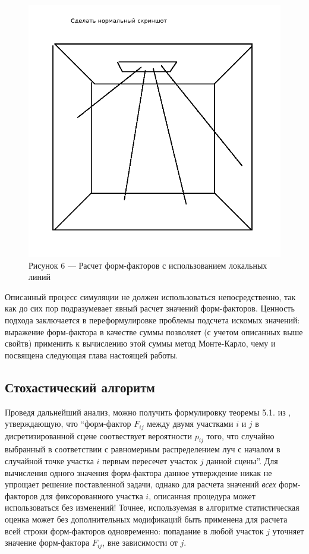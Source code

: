 \documentclass[12pt]{article}
\begin{document}
\begin{figure}[h]
\centering
\includegraphics[scale=0.3]{local_lines.png}
\caption*{Рисунок 6 --- Расчет форм-факторов с использованием локальных линий}
\end{figure}

Описанный процесс симуляции не должен использоваться непосредственно, так как до сих пор подразумевает явный расчет значений форм-факторов. Ценность подхода заключается в переформулировке проблемы подсчета искомых значений: выражение форм-фактора в качестве суммы позволяет (с учетом описанных выше свойтв) применить к вычислению этой суммы метод Монте-Карло, чему и посвящена следующая глава настоящей работы.

\subsection{Стохастический алгоритм}
Проведя дальнейший анализ, можно получить формулировку теоремы 5.1. из \cite{Bek99}, утверждающую, что ``форм-фактор $F_{ij}$ между двумя участками $i$ и $j$ в дисретизированной сцене соотвествует вероятности $p_{ij}$ того, что случайно выбранный в соответствии с равномерным распределением луч с началом в случайной точке участка $i$ первым пересечет участок $j$ данной сцены''. Для вычисления одного значения форм-фактора данное утверждение никак не упрощает решение поставленной задачи, однако для расчета значений \emph{всех} форм-факторов для фиксорованного участка $i$, описанная процедура может использоваться без изменений! Точнее, используемая в алгоритме статистическая оценка может без дополнительных модификаций быть применена для расчета всей строки форм-факторов одновременно: попадание в любой участок $j$ уточняет значение форм-фактора $F_{ij}$, вне зависимости от $j$. 
\end{document}

